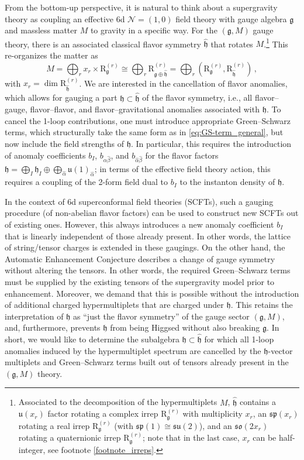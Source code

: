 \documentclass[11pt, a4paper]{article}
\newcommand*{\cN}{\ensuremath{\mathcal{N}}}
\newcommand*{\fkg}{\ensuremath{\mathfrak{g}}}
\newcommand*{\fkh}{\ensuremath{\mathfrak{h}}}
\newcommand*{\fku}{\ensuremath{\mathfrak{u}}}
\newcommand*{\fksu}{\ensuremath{\mathfrak{su}}}
\newcommand*{\fkso}{\ensuremath{\mathfrak{so}}}
\newcommand*{\fksp}{\ensuremath{\mathfrak{sp}}}
\newcommand*{\irrep}[2]{\ensuremath{\bm{\mathrm{R}}_{#1}^{(#2)}}}
\begin{document}
From the bottom-up perspective, it is natural to think about a supergravity theory as coupling an effective 6d $\cN = (1,0)$ field theory with gauge algebra $\fkg$ and massless matter $M$ to gravity in a specific way.
For the $(\fkg, M)$ gauge theory, there is an associated classical flavor symmetry $\hat{\fkh}$ that rotates $M$.\footnote{Associated to the decomposition  of the hypermultiplets $M$, $\hat{\fkh}$ contains a $\fku(x_r)$ factor rotating a complex irrep $\irrep{\fkg}{r}$ with multiplicity $x_r$, an $\fksp(x_r)$ rotating a real irrep $\irrep{\fkg}{r}$ (with $\fksp(1) \cong \fksu(2)$), and an $\fkso(2x_r)$ rotating a quaternionic irrep $\irrep{\fkg}{r}$; note that in the last case, $x_r$ can be half-integer, see footnote \ref{footnote_irreps}.}
This re-organizes the matter  as
\begin{equation}\label{eq:reps_under_flavor}
    M = \bigoplus_r x_r \times \irrep{\fkg}{r} \cong \bigoplus_r \irrep{\fkg \oplus \hat{\fkh}}{r} = \bigoplus_r (\irrep{\fkg}{r}, \irrep{\hat{\fkh}}{r})\,,
\end{equation}
with $x_r = \dim \irrep{\hat{\fkh}}{r}$. We are interested in the cancellation of flavor anomalies, which allows for gauging a part $\fkh \subset \hat{\fkh}$ of the flavor symmetry, i.e., all flavor--gauge, flavor--flavor, and flavor--gravitational anomalies associated with $\fkh$.
To cancel the 1-loop contributions, one must introduce appropriate Green--Schwarz terms, which structurally take the same form as in \cref{eq:GS-term_general}, but now include the field strengths of $\fkh$.
In particular, this requires the introduction of anomaly coefficients $b_I$, $b_{\alpha \hat{\beta}}$, and $b_{\hat{\alpha} \hat{\beta}}$  for the flavor factors $\fkh = \bigoplus_I \fkh_I \oplus \bigoplus_{\hat{\alpha}} \fku(1)_{\hat{\alpha}}$; in terms of the effective field theory action, this requires a coupling of the 2-form field dual to $b_I$ to the instanton density of $\fkh$.

In the context of 6d superconformal field theories (SCFTs), such a gauging procedure (of non-abelian flavor factors) can be used to construct new SCFTs out of existing ones.
However, this always introduces a new anomaly coefficient $b_I$ that is linearly independent of those already present.
In other words, the lattice of string/tensor charges is extended in these gaugings.
On the other hand, the Automatic Enhancement Conjecture describes a change of gauge symmetry without altering the tensors.
In other words, the required Green--Schwarz terms must be supplied by the existing tensors of the supergravity model prior to enhancement.
Moreover, we demand that this is possible without the introduction of additional charged hypermultiplets that are charged under $\fkh$.
This retains the interpretation of $\fkh$ as ``just the flavor symmetry'' of the gauge sector $(\fkg, M)$, and, furthermore, prevents $\fkh$ from being Higgsed without also breaking $\fkg$.
In short, we would like to determine the subalgebra $\fkh \subset \hat{\fkh}$ for which all 1-loop anomalies induced by the hypermultiplet spectrum  are cancelled by the $\fkh$-vector multiplets and Green--Schwarz terms built out of tensors already present in the $(\fkg, M)$ theory.
\end{document}
